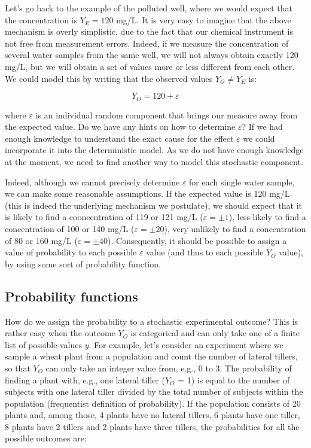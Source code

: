\documentclass[a4paper,12pt,oneside]{book}
\begin{document}
Let's go back to the example of the polluted well, where we would expect that the concentration is \(Y_E = 120\) mg/L. It is very easy to imagine that the above mechanism is overly simplistic, due to the fact that our chemical instrument is not free from measurement errors. Indeed, if we measure the concentration of several water samples from the same well, we will not always obtain exactly 120 mg/L, but we will obtain a set of values more or less different from each other. We could model this by writing that the observed values \(Y_O \neq Y_E\) is:

\[Y_O = 120 + \varepsilon\]

where \(\varepsilon\) is an individual random component that brings our measure away from the expected value. Do we have any hints on how to determine \(\varepsilon\)? If we had enough knowledge to understand the exact cause for the effect \(\varepsilon\) we could incorporate it into the deterministic model. As we do not have enough knowledge at the moment, we need to find another way to model this stochastic component.

Indeed, although we cannot precisely determine \(\varepsilon\) for each single water sample, we can make some reasonable assumptions. If the expected value is 120 mg/L (this is indeed the underlying mechanism we postulate), we should expect that it is likely to find a cooncentration of 119 or 121 mg/L (\(\varepsilon = \pm 1\)), less likely to find a concentration of 100 or 140 mg/L (\(\varepsilon = \pm 20\)), very unlikely to find a concentration of 80 or 160 mg/L (\(\varepsilon = \pm 40\)). Consequently, it should be possible to assign a value of probability to each possible \(\varepsilon\) value (and thus to each possible \(Y_O\) value), by using some sort of probability function.

\hypertarget{probability-functions}{%
\subsection{Probability functions}\label{probability-functions}}

How do we assign the probability to a stochastic experimental outcome? This is rather easy when the outcome \(Y_O\) is categorical and can only take one of a finite list of possible values \(y\). For example, let's consider an experiment where we sample a wheat plant from a population and count the number of lateral tillers, so that \(Y_O\) can only take an integer value from, e.g., 0 to 3. The probability of finding a plant with, e.g., one lateral tiller (\(Y_O\) = 1) is equal to the number of subjects with one lateral tiller divided by the total number of subjects within the population (frequentist definition of probability). If the population consists of 20 plants and, among those, 4 plants have no lateral tillers, 6 plants have one tiller, 8 plants have 2 tillers and 2 plants have three tillers, the probabilities for all the possible outcomes are:
\end{document}
